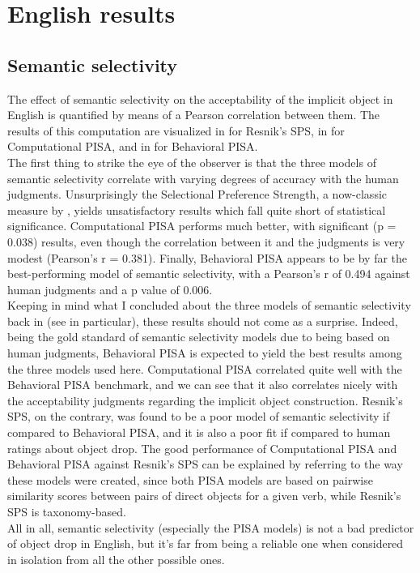 \section{English results} 

\subsection{Semantic selectivity} 

The effect of semantic selectivity on the acceptability of the implicit object in English is quantified by means of a Pearson correlation between them. The results of this computation are visualized in  for Resnik's SPS, in  for Computational PISA, and in  for Behavioral PISA.\\
The first thing to strike the eye of the observer is that the three models of semantic selectivity correlate with varying degrees of accuracy with the human judgments. Unsurprisingly the Selectional Preference Strength, a now-classic measure by \textcite{Resnik1993,Resnik1996}, yields unsatisfactory results which fall quite short of statistical significance. Computational PISA performs much better, with significant (p = 0.038) results, even though the correlation between it and the judgments is very modest (Pearson's r = 0.381). Finally, Behavioral PISA appears to be by far the best-performing model of semantic selectivity, with a Pearson's r of 0.494 against human judgments and a p value of 0.006.\\ 
Keeping in mind what I concluded about the three models of semantic selectivity back in  (see  in particular), these results should not come as a surprise. Indeed, being the gold standard of semantic selectivity models due to being based on human judgments, Behavioral PISA is expected to yield the best results among the three models used here. Computational PISA correlated quite well with the Behavioral PISA benchmark, and we can see that it also correlates nicely with the acceptability judgments regarding the implicit object construction. Resnik's SPS, on the contrary, was found to be a poor model of semantic selectivity if compared to Behavioral PISA, and it is also a poor fit if compared to human ratings about object drop. The good performance of Computational PISA and Behavioral PISA against Resnik's SPS can be explained by referring to the way these models were created, since both PISA models are based on pairwise similarity scores between pairs of direct objects for a given verb, while Resnik's SPS is taxonomy-based.\\
All in all, semantic selectivity (especially the PISA models) is not a bad predictor of object drop in English, but it's far from being a reliable one when considered in isolation from all the other possible ones.

